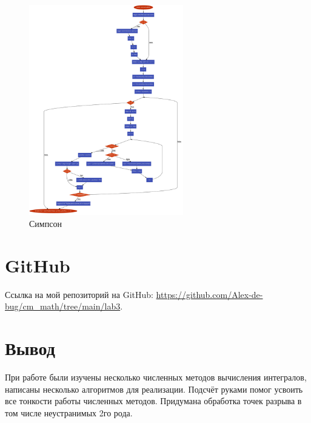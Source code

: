 \documentclass{article}
\begin{document}
\begin{figure}[H]
    \centering
    \includegraphics[width=0.6\textwidth]{simpson.pdf}
    \caption{Симпсон}
    \label{fig:logs}
\end{figure}

\section{GitHub}
Ссылка на мой репозиторий на GitHub: \url{https://github.com/Alex-de-bug/cm_math/tree/main/lab3}.

\section{Вывод}
При работе были изучены несколько численных методов вычисления интегралов, написаны несколько алгоритмов для реализации. Подсчёт руками помог усвоить все тонкости работы численных методов. Придумана обработка точек разрыва в том числе неустранимых 2го рода.
\end{document}
